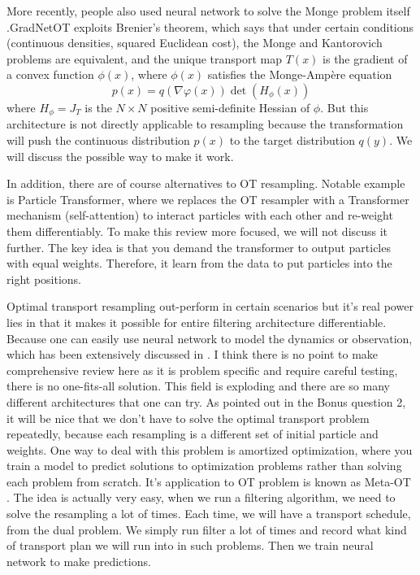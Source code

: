 \documentclass{article}
\begin{document}
More recently, people also used neural network to solve the Monge problem itself \cite{chaudhari2025gradnetot}.GradNetOT exploits Brenier's theorem, which says that under certain conditions (continuous densities, squared Euclidean cost), the Monge and Kantorovich problems are equivalent, and the unique transport map $T(x)$ is the gradient of a convex function $\phi(x)$, where $\phi(x)$ satisfies the Monge-Ampère equation
\begin{equation}
    p(x) = q(\nabla\varphi(x)) \det(H_{\phi}(x))
\end{equation}
where $H_{\phi} = J_T$ is the $N \times N$ positive semi-definite Hessian of $\phi$. But this architecture is not directly applicable to resampling because the transformation will push the continuous distribution $p(x)$ to the target distribution $q(y)$. We will discuss the possible way to make it work.

In addition, there are of course alternatives to OT resampling. Notable example is Particle Transformer\cite{Zhu2020TowardsDR,Lee2019SetTransformer}, where we replaces the OT resampler with a Transformer mechanism (self-attention) to interact particles with each other and re-weight them differentiably. To make this review more focused, we will not discuss it further. The key idea is that you demand the transformer to output particles with equal weights. Therefore, it learn from the data to put particles into the right positions.

Optimal transport resampling out-perform in certain scenarios but it's real power lies in that it makes it possible for entire filtering architecture differentiable. Because one can easily use neural network to model the dynamics or observation, which has been extensively discussed in \cite{chen2023overview}. I think there is no point to make comprehensive review here as it is problem specific and require careful testing, there is no one-fits-all solution. This field is exploding and there are so many different architectures that one can try. As pointed out in the Bonus question 2, it will be nice that we don't have to solve the optimal transport problem repeatedly, because each resampling is a different set of initial particle and weights. One way to deal with this problem is amortized optimization\cite{amos2022amortized}, where you train a model to predict solutions to optimization problems rather than solving each problem from scratch. It's application to OT problem is known as Meta-OT \cite{amos2023meta}. The idea is actually very easy, when we run a filtering algorithm, we need to solve the resampling a lot of times. Each time, we will have a transport schedule, from the dual problem. We simply run filter a lot of times and record what kind of transport plan we will run into in such problems. Then we train neural network to make predictions.  
\end{document}
